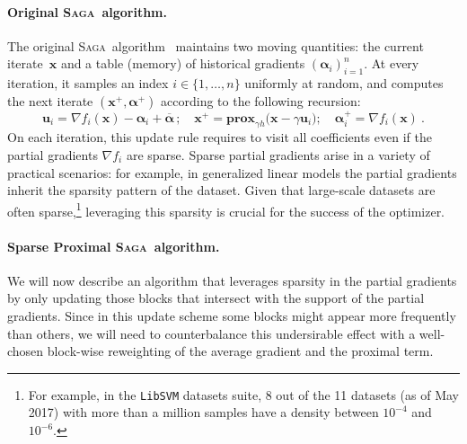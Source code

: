 \documentclass{article}
\newcommand{\SAGAsection}{\textsc{Saga}}
\def\prox{{\mathbf{prox}}}
\newcommand{\SAGA}{\textsc{Saga}}
\def\xx{{\boldsymbol x}}
\def\uu{{\boldsymbol u}}
\def\balpha{{\boldsymbol \alpha}}
\begin{document}
\paragraph{Original \SAGAsection\ algorithm.} The original \SAGA\ algorithm~\citep{defazio2014saga} maintains two moving quantities: the current iterate~$\xx$ and a table (memory) of historical gradients $({\boldsymbol\alpha}_i)_{i=1}^n$.
At every iteration, it samples an index $i \in \{1,\ldots, n\}$ uniformly at random, and computes the next iterate $(\xx^+, \balpha^+)$ according to the following recursion:
\begin{equation}\label{eq:original_saga}
  \uu_i = \nabla f_i(\xx) - {\boldsymbol\alpha}_i + \overline{\boldsymbol\alpha} \,;\quad\xx^+ = \prox_{\gamma h}\big(\xx - \gamma \uu_i\big);\quad {\boldsymbol\alpha}_i^+ = \nabla f_i(\xx)~.
\end{equation}
%
On each iteration, this update rule requires to visit all coefficients even if the partial gradients $\nabla f_i$ are sparse.
Sparse partial gradients arise in a variety of practical scenarios: for example, in generalized linear models the partial gradients inherit the sparsity pattern of the dataset.
Given that large-scale datasets are often sparse,\footnote{For example, in the \texttt{LibSVM} datasets suite, 8 out of the 11 datasets (as of May 2017) with more than a million samples have a density between $10^{-4}$ and $10^{-6}$.} leveraging this sparsity is crucial for the success of the optimizer.



\paragraph{Sparse Proximal \SAGAsection\ algorithm.} We will now describe an algorithm that leverages sparsity in the partial gradients by only updating those blocks that intersect with the support of the partial gradients. 
Since in this update scheme some blocks might appear more frequently than others, we will need to counterbalance this undersirable effect with a well-chosen block-wise reweighting of the average gradient and the proximal term. 
\end{document}
